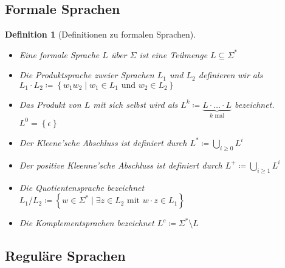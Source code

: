 \documentclass[11pt]{article}
\newcommand{\set}[1]{\left\lbrace #1\right\rbrace}
\theoremstyle{break}
\newtheorem{defi}[satz]{Definition}
\begin{document}
    \subsection{Formale Sprachen}
	\label{subsec:formale-sprachenindex}

    \begin{defi}[Definitionen zu formalen Sprachen]
        \begin{itemize}
            \item Eine formale Sprache $L$ über $\Sigma$ ist eine Teilmenge $L\subseteq\Sigma^*$
            \item Die Produktsprache zweier Sprachen $L_1$ und $L_2$ definieren wir als\\ $L_1\cdot L_2\coloneqq\set{w_{1}w_{2}\mid w_{1}\in L_{1}\text{ und } w_{2}\in L_2}$
            \item Das Produkt von $L$ mit sich selbst wird als $L^k\coloneqq \underbrace{L\cdot\dots\cdot L}_{k\text{ mal}}$ bezeichnet. $L^0 = \set{\epsilon}$
            \item Der Kleene'sche Abschluss ist definiert durch $L^*\coloneqq \bigcup\limits_{i\geq 0} L^i$
            \item Der positive Kleenne'sche Abschluss ist definiert durch $L^+\coloneqq \bigcup\limits_{i\geq 1} L^i$
            \item Die Quotientensprache bezeichnet $L_1/L_2\coloneqq\set{w\in \Sigma^*\mid\exists z\in L_2\text{ mit } w\cdot z\in L_1}$
            \item Die Komplementsprachen bezeichnet $L^c\coloneqq\Sigma^*\setminus L$
        \end{itemize}
    \end{defi}


    \subsection{Reguläre Sprachen}
	\label{subsec:reguläre-sprachenindex}
\end{document}
